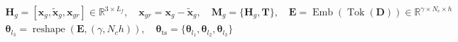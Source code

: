 ﻿\documentclass{article}
\begin{document}
\begin{preview}
\(\displaystyle
\begin{gathered}
  \bm H_g
  = [\bm{x}_g,\tilde{\bm{x}}_g,\bm{x}_{gr}]\in\mathbb{R}^{3\times L_f}, \quad
  \bm{x}_{gr}
  = \bm{x}_g-\tilde{\bm{x}}_g, \quad
  \bm{M}_g
  = \{\bm H_g,\bm T\}, \quad
  \bm E
  = \operatorname{Emb}(\operatorname{Tok}(\bm D))
  \in \mathbb{R}^{\gamma\times N_c\times h} \\
  \bm\theta_{l_3}
  = \operatorname{reshape}(\bm E,(\gamma,N_ch)), \quad
  \bm\theta_{\mathrm{ts}}
  =\{\bm\theta_{l_1},\bm\theta_{l_2},\bm\theta_{l_3}\}
\end{gathered}
\)
\end{preview}
\end{document}

